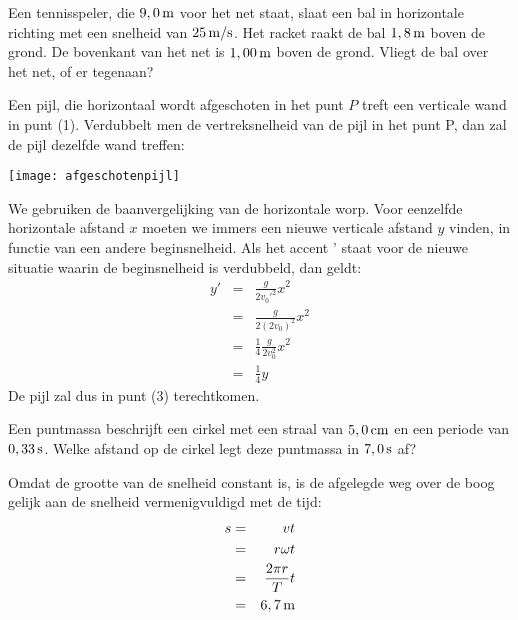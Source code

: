 \documentclass{ximera}
\begin{document}
\begin{exercise}
	Een tennisspeler, die $9,0\rm\,m$ voor het net staat, slaat een bal in horizontale richting met een snelheid van $25\rm\,m/s$. Het racket raakt de bal $1,8\rm\,m$ boven de grond. De bovenkant van het net is $1,00\rm\,m$ boven de grond. Vliegt de bal over het net, of er tegenaan?
\end{exercise}

\begin{exercise}
	Een pijl, die horizontaal wordt afgeschoten in het punt $P$ treft een verticale wand in punt (1). Verdubbelt men de vertreksnelheid van de pijl in het punt P, dan zal de pijl dezelfde wand treffen:
	\newline

	\begin{minipage}{0.4\textwidth}
		\begin{multipleChoice}
		\end{multipleChoice}
	\end{minipage}
	\hfill
	\begin{minipage}{0.6\textwidth}
		\begin{image}
			\texttt{[image: afgeschotenpijl]}
		\end{image}
	\end{minipage}

\begin{oplossing}
	We gebruiken de baanvergelijking van de
	horizontale worp. Voor eenzelfde horizontale afstand $x$ moeten we immers een nieuwe verticale afstand $y$ vinden, in functie van een andere beginsnelheid. Als het accent ' staat voor de nieuwe situatie waarin de beginsnelheid is verdubbeld, dan geldt:
	\begin{eqnarray*}
		y'&=&\frac{g}{2v_0'^2}x^2\\
		&=&\frac{g}{2(2v_0)^2}x^2\\
		&=&\frac{1}{4}\frac{g}{2v_0^2}x^2\\
		&=&\frac{1}{4}y
	\end{eqnarray*}
	De pijl zal dus in punt (3) terechtkomen.
\end{oplossing}
\end{exercise}

\begin{exercise}
	Een puntmassa beschrijft een cirkel met een straal van $5,0\rm\,cm$ en een periode van $0,33\rm\,s$. Welke afstand op de cirkel legt deze puntmassa in $7,0\rm\,s$ af?
	\begin{oplossing}
		Omdat de grootte van de snelheid constant is, is de
		afgelegde weg over de boog gelijk aan de snelheid vermenigvuldigd met de tijd:
		\begin{eqnarray*}
			s&=&vt\\
			&=&r\omega t\\
			&=&\frac{2\pi r}{T}t\\
			&=&6,7\rm\,m
		\end{eqnarray*}
	\end{oplossing}
\end{exercise}
\end{document}
